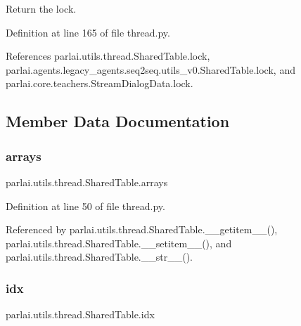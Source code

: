 \begin{DoxyVerb}Return the lock.\end{DoxyVerb}
 

Definition at line 165 of file thread.\+py.



References parlai.\+utils.\+thread.\+Shared\+Table.\+lock, parlai.\+agents.\+legacy\+\_\+agents.\+seq2seq.\+utils\+\_\+v0.\+Shared\+Table.\+lock, and parlai.\+core.\+teachers.\+Stream\+Dialog\+Data.\+lock.



\subsection{Member Data Documentation}
\mbox{\label{classparlai_1_1utils_1_1thread_1_1SharedTable_a722e0cb6428af2282f4a2697c2c86d01}} 
\subsubsection{\texorpdfstring{arrays}{arrays}}
{\footnotesize\ttfamily parlai.\+utils.\+thread.\+Shared\+Table.\+arrays}



Definition at line 50 of file thread.\+py.



Referenced by parlai.\+utils.\+thread.\+Shared\+Table.\+\_\+\+\_\+getitem\+\_\+\+\_\+(), parlai.\+utils.\+thread.\+Shared\+Table.\+\_\+\+\_\+setitem\+\_\+\+\_\+(), and parlai.\+utils.\+thread.\+Shared\+Table.\+\_\+\+\_\+str\+\_\+\+\_\+().

\mbox{\label{classparlai_1_1utils_1_1thread_1_1SharedTable_aec0fa85ca2544dd6220db34c7da01a08}} 
\subsubsection{\texorpdfstring{idx}{idx}}
{\footnotesize\ttfamily parlai.\+utils.\+thread.\+Shared\+Table.\+idx}



